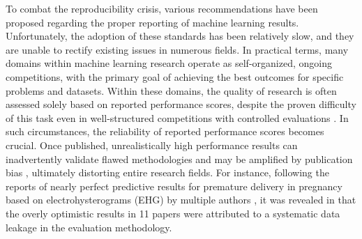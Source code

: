\documentclass[5p, final]{elsarticle}
\begin{document}
To combat the reproducibility crisis, various recommendations have been proposed \cite{repr0, repr2} regarding the proper reporting of machine learning results. Unfortunately, the adoption of these standards has been relatively slow, and they are unable to rectify existing issues in numerous fields.
In practical terms, many domains within machine learning research operate as self-organized, ongoing competitions, with the primary goal of achieving the best outcomes for specific problems and datasets. Within these domains, the quality of research is often assessed solely based on reported performance scores, despite the proven difficulty of this task even in well-structured competitions with controlled evaluations \cite{ranking}. In such circumstances, the reliability of reported performance scores becomes crucial. Once published, unrealistically high performance results can inadvertently validate flawed methodologies and may be amplified by publication bias \cite{publicationbias}, ultimately distorting entire research fields.
For instance, following the reports of nearly perfect predictive results for premature delivery in pregnancy based on electrohysterograms (EHG) by multiple authors \cite{ehgreview}, it was revealed in \cite{ehg} that the overly optimistic results in 11 papers were attributed to a systematic data leakage in the evaluation methodology.
\end{document}
